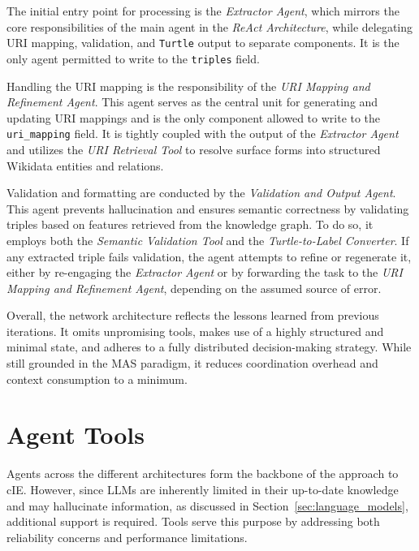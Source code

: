 \documentclass[a4paper,oneside,bibliography=totoc]{scrbook}
\begin{document}
The initial entry point for processing is the \textit{Extractor Agent}, which mirrors the core responsibilities of the main agent in the \textit{ReAct Architecture}, while delegating URI mapping, validation, and \texttt{Turtle} output to separate components. It is the only agent permitted to write to the \texttt{triples} field.

Handling the URI mapping is the responsibility of the \textit{URI Mapping and Refinement Agent}. This agent serves as the central unit for generating and updating URI mappings and is the only component allowed to write to the \texttt{uri\_mapping} field. It is tightly coupled with the output of the \textit{Extractor Agent} and utilizes the \textit{URI Retrieval Tool} to resolve surface forms into structured Wikidata entities and relations.

Validation and formatting are conducted by the \textit{Validation and Output Agent}. This agent prevents hallucination and ensures semantic correctness by validating triples based on features retrieved from the knowledge graph. To do so, it employs both the \textit{Semantic Validation Tool} and the \textit{Turtle-to-Label Converter}. If any extracted triple fails validation, the agent attempts to refine or regenerate it, either by re-engaging the \textit{Extractor Agent} or by forwarding the task to the \textit{URI Mapping and Refinement Agent}, depending on the assumed source of error.

Overall, the network architecture reflects the lessons learned from previous iterations. It omits unpromising tools, makes use of a highly structured and minimal state, and adheres to a fully distributed decision-making strategy. While still grounded in the \ac{MAS} paradigm, it reduces coordination overhead and context consumption to a minimum.

\section{Agent Tools}
\label{sec:agent_tools}


Agents across the different architectures form the backbone of the approach to \ac{cIE}. However, since \acp{LLM} are inherently limited in their up-to-date knowledge and may hallucinate information, as discussed in Section~\ref{sec:language_models}, additional support is required. Tools serve this purpose by addressing both reliability concerns and performance limitations.
\end{document}
